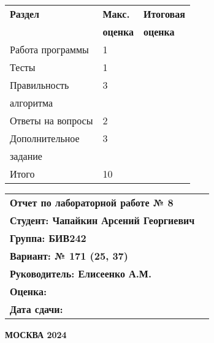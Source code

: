 \begin{titlepage}
    \begin{minipage}{0.35\textwidth}
        \begin{tabular}{|l|l|l|}
            \hline
            \textbf{Раздел} & \textbf{Макс.} & \textbf{Итоговая}\\
            & \textbf{оценка} & \textbf{оценка} \\[2ex]
            \hline
            Работа программы & 1 & \\[3ex]
            \hline
            Тесты & 1 & \\[3ex]
            \hline
            Правильность & 3 & \\
            алгоритма & & \\[3ex]
            \hline
            Ответы на вопросы & 2 & \\[3ex]
            \hline
            Дополнительное & 3 & \\
            задание & & \\[3ex]
            \hline
            Итого & 10 & \\[3ex]
            \hline
        \end{tabular}
    \end{minipage}%
    \hfill
    \begin{minipage}{0.45\textwidth}
        \begin{tabular}{lc}
            \textbf{Отчет по лабораторной работе № 8} & \\[2ex]
            \textbf{Студент: Чапайкин Арсений Георгиевич} &\\[2ex]
            \textbf{Группа: БИВ242} & \\[2ex]
            \textbf{Вариант: № 171 (25, 37)} &\\[2ex]
            \textbf{Руководитель: Елисеенко А.М.} &\\[2ex]
            \textbf{Оценка:} &\\[2ex]
            \textbf{Дата сдачи:} &\\[2ex]
        \end{tabular}
    \end{minipage}%
    \vspace*{\fill}
    \begin{center}
        \textbf{МОСКВА 2024}
    \end{center}
\end{titlepage}
